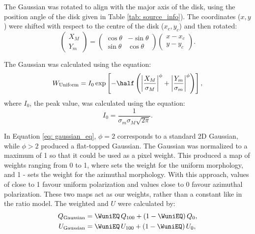 The Gaussian was rotated to align with the major axis of the disk, using the position angle of the disk given in Table \ref{tab: source_info}). The coordinates ($x, y$) were shifted with respect to the centre of the disk ($x_c, y_c$) and then rotated:
\begin{equation}
\begin{pmatrix}
X_M \\
Y_m
\end{pmatrix}
=
\begin{pmatrix}
\cos\theta & -\sin\theta \\
\sin\theta & \cos\theta
\end{pmatrix}
\begin{pmatrix}
x - x_c \\
y - y_c
\end{pmatrix}.
\label{eq:rotated_coordinates}
\end{equation}



The Gaussian was calculated using the equation:
\begin{equation}
W_{\text{Uniform}} =  I_0 
\exp\left[-\half \left(\left|\frac{X_{M}}{\sigma_M}\right|^\phi + \left|\frac{Y_{m}}{ \sigma_m}\right|^\phi\right)\right],
    \label{eq: gaussian_eq}
\end{equation}
\noindent where $I_0$, the peak value, was calculated using the equation:
\begin{equation}
    I_0 = \frac{1} {\sigma_m \sigma_M \sqrt{2\pi}}.
    \label{eq: Gaussian_model_I0}
\end{equation}

\noindent In Equation \ref{eq: gaussian_eq}, $\phi=2$ corresponds to a standard 2D Gaussian, while $\phi>2$ produced a flat-topped Gaussian. The Gaussian was normalized to a maximum of 1 so that it could be used as a pixel weight. This produced a map of weights ranging from 0 to 1, where \Wuni sets the weight for the uniform morphology, and 1 - \Wuni sets the weight for the azimuthal morphology. With this approach, values of \Wuni close to 1 favour uniform polarization and values close to 0 favour azimuthal polarization. These two maps act as our weights, rather than a constant like in the ratio model. The weighted \SQ and $U$ were calculated by:
\begin{equation}
\begin{aligned}
Q_{\text{Gaussian}}
    &= \WuniEQ \,Q_{100}
     + (1 - \WuniEQ)\,Q_0, \\
U_{\text{Gaussian}}
    &= \WuniEQ\,U_{100}
     + (1 - \WuniEQ)\,U_0,
\end{aligned}
\end{equation}

